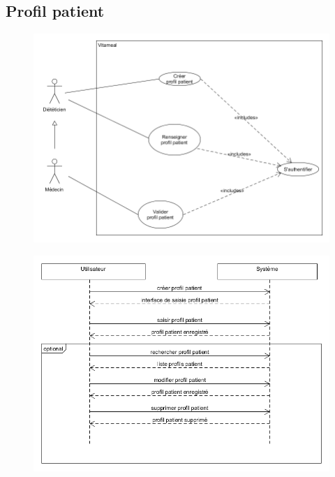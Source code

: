 \documentclass{beamer}
\begin{document}
\subsection{Profil patient}
\begin{frame}[plain]{}
%
\begin{figure}
\centering
\includegraphics[scale=0.4]{../CasDUtilisations/ProfilPatient/UseCaseProfilPatient.png}
\end{figure}
\end{frame}

\begin{frame}[plain]{}
\begin{figure}
\centering
\includegraphics[scale=0.4]{../CasDUtilisations/ProfilPatient/diagseqProfilPatient.png}
\end{figure}
\end{frame}
\end{document}
